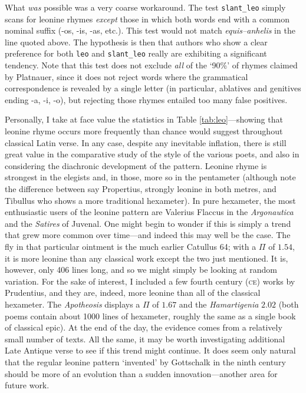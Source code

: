 \documentclass[twocolumn, switch, a4paper]{article} %
\begin{document}
What \emph{was} possible was a very coarse workaround. The test
\texttt{slant\_leo} simply scans for leonine rhymes \emph{except} those in
which both words end with a common nominal suffix (-os, -is, -as, etc.). This
test would not match \emph{equis--anhelis} in the line quoted above. The
hypothesis is then that authors who show a clear preference for both
\texttt{leo} and \texttt{slant\_leo} really are exhibiting a significant
tendency. Note that this test does not exclude \emph{all} of the `90\%' of
rhymes claimed by Platnauer, since it does not reject words where the
grammatical correspondence is revealed by a single letter (in particular,
ablatives and genitives ending -a, -i, -o), but rejecting those rhymes
entailed too many false positives.

Personally, I take at face value the statistics in Table
\ref{tab:leo}---showing that leonine rhyme occurs more frequently than chance
would suggest throughout classical Latin verse. In any case, despite any
inevitable inflation, there is still great value in the comparative study of
the style of the various poets, and also in considering the diachronic
development of the pattern. Leonine rhyme is strongest in the elegists and, in
those, more so in the pentameter (although note the difference between say
Propertius, strongly leonine in both metres, and Tibullus who shows a more
traditional hexameter). In pure hexameter, the most enthusiastic users of the
leonine pattern are Valerius Flaccus in the \emph{Argonautica} and the
\emph{Satires} of Juvenal. One might begin to wonder if this is simply a trend
that grew more common over time---and indeed this may well be the case. The
fly in that particular ointment is the much earlier Catullus 64; with a $\Pi$
of $1.54$, it is more leonine than any classical work except the two just
mentioned. It is, however, only 406 lines long, and so we might simply be
looking at random variation. For the sake of interest, I included a few fourth
century (\textsc{ce}) works by Prudentius, and they are, indeed, more leonine
than all of the classical hexameter. The \emph{Apotheosis} displays a $\Pi$ of
$1.67$ and the \emph{Hamartigenia} $2.02$ (both poems contain about 1000 lines
of hexameter, roughly the same as a single book of classical epic). At the end
of the day, the evidence comes from a relatively small number of texts. All
the same, it may be worth investigating additional Late Antique verse to see
if this trend might continue. It does seem only natural that the regular
leonine pattern `invented' by Gottschalk in the ninth century should be more
of an evolution than a sudden innovation---another area for future work.
\end{document}
